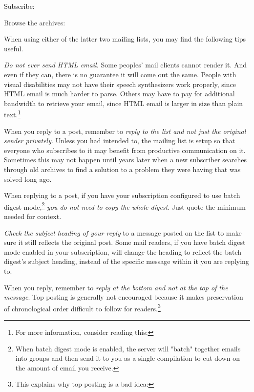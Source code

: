 \blank[2*big]
\startnarrower[3*left]
Subscribe:\crlf
{} 

\blank[2*big]
Browse the archives:\crlf
{}
\stopnarrower

When using either of the latter two mailing lists, you may find the following tips useful.

\startitemize[4]
\item
{\it Do not ever send HTML email.} Some peoples' mail clients cannot render it. And even if they can, there is no guarantee it will come out the same. People with visual disabilities may not have their speech synthesizers work properly, since HTML email is much harder to parse. Others may have to pay for additional bandwidth to retrieve your email, since HTML email is larger in size than plain text.\footnote{For more information, consider reading this: }

\item
When you reply to a post, remember to {\it reply to the list and not just the original sender privately}. Unless you had intended to, the mailing list is setup so that everyone who subscribes to it may benefit from productive communication on it. Sometimes this may not happen until years later when a new subscriber searches through old archives to find a solution to a problem they were having that was solved long ago.

\item
When replying to a post, if you have your subscription configured to use batch digest mode,\footnote{When batch digest mode is enabled, the server will "batch" together emails into groups and then send it to you as a single compilation to cut down on the amount of email you receive.} {\it you do not need to copy the whole digest}. Just quote the minimum needed for context.

\item
{\it Check the subject heading of your reply} to a message posted on the list to make sure it still reflects the original post. Some mail readers, if you have batch digest mode enabled in your subscription, will change the heading to reflect the batch digest's subject heading, instead of the specific message within it you are replying to.

\item
When you reply, remember to {\it reply at the bottom and not at the top of the message}. Top posting is generally not encouraged because it makes preservation of chronological order difficult to follow for readers.\footnote{This explains why top posting is a bad idea: }
\stopitemize

